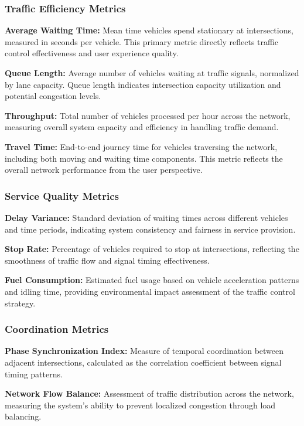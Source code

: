 \subsubsection{Traffic Efficiency Metrics}

\textbf{Average Waiting Time:} Mean time vehicles spend stationary at intersections, measured in seconds per vehicle. This primary metric directly reflects traffic control effectiveness and user experience quality.

\textbf{Queue Length:} Average number of vehicles waiting at traffic signals, normalized by lane capacity. Queue length indicates intersection capacity utilization and potential congestion levels.

\textbf{Throughput:} Total number of vehicles processed per hour across the network, measuring overall system capacity and efficiency in handling traffic demand.

\textbf{Travel Time:} End-to-end journey time for vehicles traversing the network, including both moving and waiting time components. This metric reflects the overall network performance from the user perspective.

\subsubsection{Service Quality Metrics}

\textbf{Delay Variance:} Standard deviation of waiting times across different vehicles and time periods, indicating system consistency and fairness in service provision.

\textbf{Stop Rate:} Percentage of vehicles required to stop at intersections, reflecting the smoothness of traffic flow and signal timing effectiveness.

\textbf{Fuel Consumption:} Estimated fuel usage based on vehicle acceleration patterns and idling time, providing environmental impact assessment of the traffic control strategy.

\subsubsection{Coordination Metrics}

\textbf{Phase Synchronization Index:} Measure of temporal coordination between adjacent intersections, calculated as the correlation coefficient between signal timing patterns.

\textbf{Network Flow Balance:} Assessment of traffic distribution across the network, measuring the system's ability to prevent localized congestion through load balancing.


